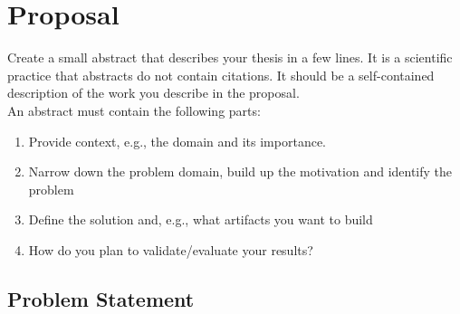 
\newcommand{\authorname}{}

\newcommand{\worktype}{Research Proposal}
\newcommand{\proposalTitle}{Proposal Title}

\newcommand{\supervisor}{Paul Schmiedmayer, PhD}
\newcommand{\advisors}{}

\newcommand{\submissionDate}{\today}



 





\frontmatter




\mainmatter

\chapter*{Proposal}

\begin{tcolorbox}
	Create a small abstract that describes your thesis in a few lines.
	It is a scientific practice that abstracts do not contain citations.
	It should be a self-contained description of the work you describe in the proposal.
	\\
	An abstract must contain the following parts:
	\begin{enumerate}
		\item Provide context, e.g., the domain and its importance.
		\item Narrow down the problem domain, build up the motivation and identify the problem
		\item Define the solution and, e.g., what artifacts you want to build
		\item How do you plan to validate/evaluate your results?
	\end{enumerate}
\end{tcolorbox}

\section*{Problem Statement}

